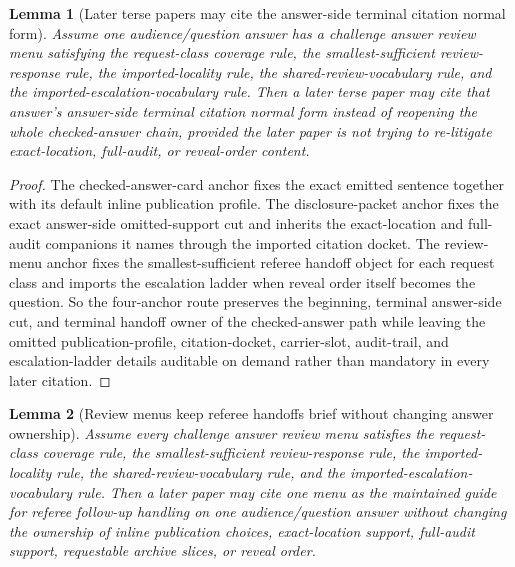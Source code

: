 \documentclass[11pt]{article}
\newtheorem{lemma}{Lemma}
\begin{document}
\begin{lemma}[Later terse papers may cite the answer-side terminal citation normal form]
Assume one audience/question answer has a challenge answer review menu satisfying the request-class coverage rule, the smallest-sufficient review-response rule, the imported-locality rule, the shared-review-vocabulary rule, and the imported-escalation-vocabulary rule.
Then a later terse paper may cite that answer's answer-side terminal citation normal form instead of reopening the whole checked-answer chain, provided the later paper is not trying to re-litigate exact-location, full-audit, or reveal-order content.
\end{lemma}

\begin{proof}
The checked-answer-card anchor fixes the exact emitted sentence together with its default inline publication profile.
The disclosure-packet anchor fixes the exact answer-side omitted-support cut and inherits the exact-location and full-audit companions it names through the imported citation docket.
The review-menu anchor fixes the smallest-sufficient referee handoff object for each request class and imports the escalation ladder when reveal order itself becomes the question.
So the four-anchor route preserves the beginning, terminal answer-side cut, and terminal handoff owner of the checked-answer path while leaving the omitted publication-profile, citation-docket, carrier-slot, audit-trail, and escalation-ladder details auditable on demand rather than mandatory in every later citation.\qedhere
\end{proof}

\begin{lemma}[Review menus keep referee handoffs brief without changing answer ownership]
Assume every challenge answer review menu satisfies the request-class coverage rule, the smallest-sufficient review-response rule, the imported-locality rule, the shared-review-vocabulary rule, and the imported-escalation-vocabulary rule.
Then a later paper may cite one menu as the maintained guide for referee follow-up handling on one audience/question answer without changing the ownership of inline publication choices, exact-location support, full-audit support, requestable archive slices, or reveal order.
\end{lemma}
\end{document}
